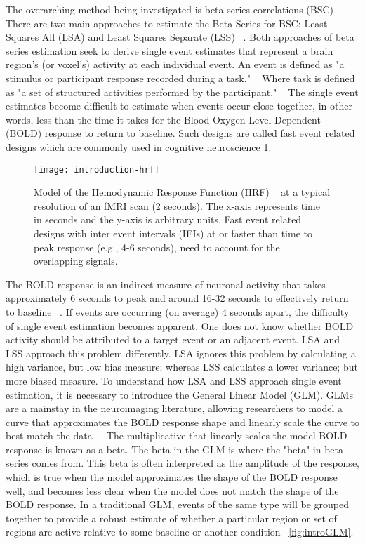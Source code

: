 \documentclass[10pt,letterpaper]{article}
\begin{document}
The overarching method being investigated is beta series correlations (BSC) ~\cite{Rissman2004,Mumford2012,Turner2012a,Abdulrahman2016}
There are two main approaches to estimate the Beta Series for BSC: Least Squares All (LSA) and Least Squares Separate (LSS) ~\cite{Mumford2012}.
Both approaches of beta series estimation seek to derive single event estimates that represent a brain region's
(or voxel's) activity at each individual event.
An event is defined as "a stimulus or participant response recorded during a task." ~\cite{Gorgolewski2016}
Where task is defined as "a set of structured activities performed by the participant." ~\cite{Gorgolewski2016}
The single event estimates become difficult to estimate when events occur close together,
in other words, less than the time it takes for the Blood Oxygen Level Dependent (BOLD) response to return to baseline.
Such designs are called fast event related designs which are commonly used in cognitive neuroscience \ref{fig:introhrf}.

\begin{figure}[H]
  \centering
  \texttt{[image: introduction-hrf]}
  \caption{
    Model of the Hemodynamic Response Function (HRF) ~\cite{Glover1999} at a
    typical resolution of an fMRI scan (2 seconds).
    The x-axis represents time in seconds and the y-axis is arbitrary units.
    Fast event related designs with inter event intervals (IEIs) at or faster than time to peak
    response (e.g., 4-6 seconds), need to account for the overlapping signals.
  }
  \label{fig:introhrf}
\end{figure}

The BOLD response is an indirect measure of neuronal activity that takes approximately 6 seconds to
peak and around 16-32 seconds to effectively return to baseline ~\cite{Glover1999}.
If events are occurring (on average) 4 seconds apart, the difficulty of single event estimation
becomes apparent.
One does not know whether BOLD activity should be attributed to a target event or an
adjacent event.
LSA and LSS approach this problem differently.
LSA ignores this problem by calculating a high variance, but low bias measure;
whereas LSS calculates a lower variance; but more biased measure.
To understand how LSA and LSS approach single event estimation, it is necessary to introduce
the General Linear Model (GLM).
GLMs are a mainstay in the neuroimaging literature, allowing researchers to model
a curve that approximates the BOLD response shape and linearly scale the curve
to best match the data ~\cite{Friston1995}.
The multiplicative that linearly scales the model BOLD response is known as a beta.
The beta in the GLM is where the "beta" in beta series comes from.
This beta is often interpreted as the amplitude of the response, which is true when the
model approximates the shape of the BOLD response well, and becomes less clear when
the model does not match the shape of the BOLD response.
In a traditional GLM, events of the same type will be grouped together
to provide a robust estimate of whether a particular region or set of regions are
active relative to some baseline or another condition ~\ref{fig:introGLM}.
\end{document}
